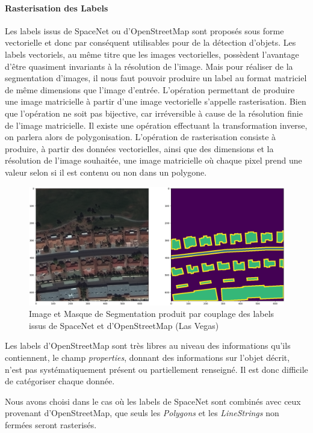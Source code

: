 \documentclass[a4paper, 11pt]{report}
\begin{document}
\paragraph{Rasterisation des Labels}
Les labels issus de SpaceNet ou d'OpenStreetMap sont proposés sous forme vectorielle et donc par conséquent utilisables pour de la détection d'objets.
Les labels vectoriels, au même titre que les images vectorielles, possèdent l'avantage d'être quasiment invariants à la résolution de l'image.
Mais pour réaliser de la segmentation d'images, il nous faut pouvoir produire un label au format matriciel de même dimensions que l'image d'entrée.
L'opération permettant de produire une image matricielle à partir d'une image vectorielle s'appelle rasterisation. Bien que l'opération ne soit pas bijective, car irréversible à cause de la résolution finie de l'image matricielle. Il existe une opération effectuant la transformation inverse, on parlera alors de polygonisation.
L'opération de rasterisation consiste à produire, à partir des données vectorielles, ainsi que des dimensions et la résolution de l'image souhaitée, une image matricielle où chaque pixel prend une valeur selon si il est contenu ou non dans un polygone.
\begin{figure}[H]
	\begin{center}
		\includegraphics[scale=0.3]{Images/MUL_PAN_Label_Vegas.png}
		\caption{Image et Masque de Segmentation produit par couplage des labels issus de SpaceNet et d'OpenStreetMap (Las Vegas)}
	\end{center}
\end{figure}
Les labels d'OpenStreetMap sont très libres au niveau des informations qu'ils contiennent, le champ \emph{properties}, donnant des informations sur l'objet décrit, n'est pas systématiquement présent ou partiellement renseigné. Il est donc difficile de catégoriser chaque donnée.

Nous avons choisi dans le cas où les labels de SpaceNet sont combinés avec ceux provenant d'OpenStreetMap, que seuls les \emph{Polygons} et les \emph{LineStrings} non fermées seront rasterisés.
\end{document}
